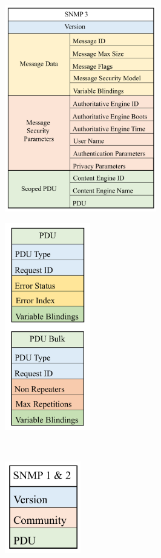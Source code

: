 \documentclass[twoside,english,brazilian]{UNISINOSmonografia}
\begin{document}
\begin{figure}
    \caption{Estrutura dos Pacotes SNMP}
	\label{fig:snmp-pdu}
    \centering
    \begin{subfigure}[b]{0.60\textwidth}
        \includegraphics[height=9cm,width=\textwidth,keepaspectratio=true]{snmp_pdu_v3}
    \end{subfigure}
\hfill
    \begin{subfigure}[b]{0.30\textwidth}
        \includegraphics[height=9cm,width=\textwidth,keepaspectratio=true]{snmp_pdu}
    \end{subfigure}
\\
    \begin{subfigure}[b]{0.27\textwidth}
        \includegraphics[height=4cm,width=\textwidth,keepaspectratio=true]{snmp_pdu_v1}

\end{subfigure}
\end{figure}
\end{document}
